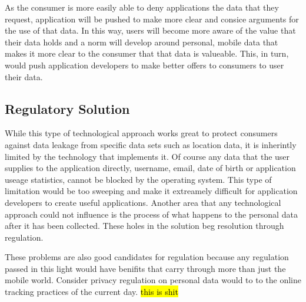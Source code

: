 As the consumer is more easily able to deny applications the data that they request, application will be pushed to make more clear and consice arguments for the use of that data. In this way, users will become more aware of the value that their data holds and a norm will develop around personal, mobile data that makes it more clear to the consumer that that data is valueable. 
This, in turn, would push application developers to make better offers to consumers to user their data. 

 	\subsection{Regulatory Solution}

While this type of technological approach works great to protect consumers against data leakage from specific data sets such as location data, it is inherintly limited by the technology that implements it. Of course any data that the user supplies to the application directly, username, email, date of birth or application useage statistics, cannot be blocked by the operating system. This type of limitation would be too sweeping and make it extreamely difficult for application developers to create useful applications. 
Another area that any technological approach could not influence is the process of what happens to the personal data after it has been collected. These holes in the solution beg resolution through regulation. 

These problems are also good candidates for regulation because any regulation passed in this light would have benifits that carry through more than just the mobile world. Consider privacy regulation on personal data would to to the online tracking practices of the current day. \hl{this is shit}








